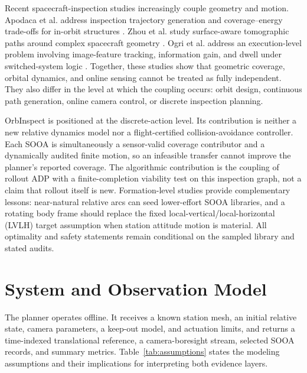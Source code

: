 \documentclass{IEEEtaes}
\theoremstyle{remark}
\theoremstyle{plain}
\begin{document}
Recent spacecraft-inspection studies increasingly couple geometry and motion. Apodaca et al. address inspection trajectory generation and coverage--energy trade-offs for in-orbit structures \cite{apodaca2025trajectory}. Zhou et al. study surface-aware tomographic paths around complex spacecraft geometry \cite{zhou2026tomographic}. Ogri et al. address an execution-level problem involving image-feature tracking, information gain, and dwell under switched-system logic \cite{ogri2025switched}. Together, these studies show that geometric coverage, orbital dynamics, and online sensing cannot be treated as fully independent. They also differ in the level at which the coupling occurs: orbit design, continuous path generation, online camera control, or discrete inspection planning.

OrbInspect is positioned at the discrete-action level. Its contribution is neither a new relative dynamics model nor a flight-certified collision-avoidance controller. Each SOOA is simultaneously a sensor-valid coverage contributor and a dynamically audited finite motion, so an infeasible transfer cannot improve the planner's reported coverage. The algorithmic contribution is the coupling of rollout ADP with a finite-completion viability test on this inspection graph, not a claim that rollout itself is new. Formation-level studies provide complementary lessons: near-natural relative arcs can seed lower-effort SOOA libraries, and a rotating body frame should replace the fixed local-vertical/local-horizontal (LVLH) target assumption when station attitude motion is material. All optimality and safety statements remain conditional on the sampled library and stated audits.

\section{System and Observation Model}
\label{sec:system}

The planner operates offline. It receives a known station mesh, an initial relative state, camera parameters, a keep-out model, and actuation limits, and returns a time-indexed translational reference, a camera-boresight stream, selected SOOA records, and summary metrics. Table~\ref{tab:assumptions} states the modeling assumptions and their implications for interpreting both evidence layers.
\end{document}
